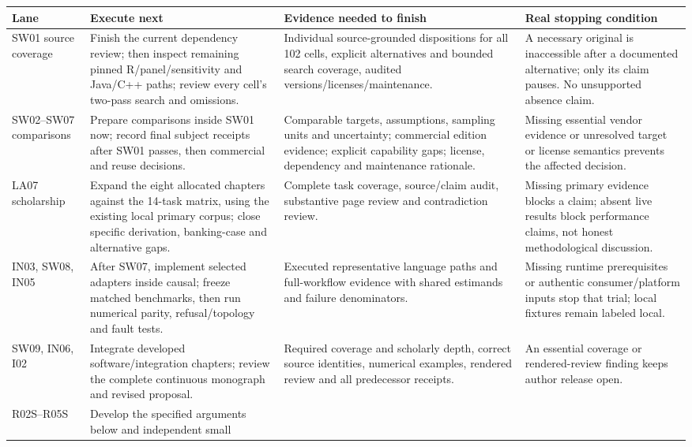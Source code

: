\documentclass[
  10pt,
]{article}
\begin{document}
\begin{longtable}[]{@{}>{\raggedright\arraybackslash}p{}>{\raggedright\arraybackslash}p{}>{\raggedright\arraybackslash}p{}>{\raggedright\arraybackslash}p{}@{}}
\toprule
Lane & Execute next & Evidence needed to finish & Real stopping
condition\tabularnewline
\midrule
\endhead
SW01 source coverage & Finish the current dependency review; then
inspect remaining pinned R/panel/sensitivity and Java/C++ paths; review
every cell's two-pass search and omissions. & Individual source-grounded
dispositions for all 102 cells, explicit alternatives and bounded search
coverage, audited versions/licenses/maintenance. & A necessary original
is inaccessible after a documented alternative; only its claim pauses.
No unsupported absence claim.\tabularnewline
SW02--SW07 comparisons & Prepare comparisons inside SW01 now; record
final subject receipts after SW01 passes, then commercial and reuse
decisions. & Comparable targets, assumptions, sampling units and
uncertainty; commercial edition evidence; explicit capability gaps;
license, dependency and maintenance rationale. & Missing essential
vendor evidence or unresolved target or license semantics prevents the
affected decision.\tabularnewline
LA07 scholarship & Expand the eight allocated chapters against the
14-task matrix, using the existing local primary corpus; close specific
derivation, banking-case and alternative gaps. & Complete task coverage,
source/claim audit, substantive page review and contradiction review. &
Missing primary evidence blocks a claim; absent live results block
performance claims, not honest methodological discussion.\tabularnewline
IN03, SW08, IN05 & After SW07, implement selected adapters inside
causal; freeze matched benchmarks, then run numerical parity,
refusal/topology and fault tests. & Executed representative language
paths and full-workflow evidence with shared estimands and failure
denominators. & Missing runtime prerequisites or authentic
consumer/platform inputs stop that trial; local fixtures remain labeled
local.\tabularnewline
SW09, IN06, I02 & Integrate developed software/integration chapters;
review the complete continuous monograph and revised proposal. &
Required coverage and scholarly depth, correct source identities,
numerical examples, rendered review and all predecessor receipts. & An
essential coverage or rendered-review finding keeps author release
open.\tabularnewline
R02S--R05S & Develop the specified arguments below and independent small

\end{longtable}
\end{document}
